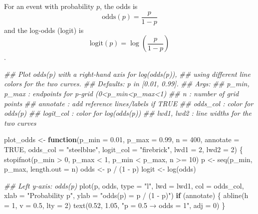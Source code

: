 \documentclass[
  letterpaper,
]{scrbook}
\newenvironment{Shaded}{\begin{snugshade}}{\end{snugshade}}
\newcommand{\AttributeTok}[1]{\textcolor[rgb]{0.40,0.45,0.13}{#1}}
\newcommand{\ConstantTok}[1]{\textcolor[rgb]{0.56,0.35,0.01}{#1}}
\newcommand{\ControlFlowTok}[1]{\textcolor[rgb]{0.00,0.23,0.31}{\textbf{#1}}}
\newcommand{\DecValTok}[1]{\textcolor[rgb]{0.68,0.00,0.00}{#1}}
\newcommand{\DocumentationTok}[1]{\textcolor[rgb]{0.37,0.37,0.37}{\textit{#1}}}
\newcommand{\FloatTok}[1]{\textcolor[rgb]{0.68,0.00,0.00}{#1}}
\newcommand{\FunctionTok}[1]{\textcolor[rgb]{0.28,0.35,0.67}{#1}}
\newcommand{\NormalTok}[1]{\textcolor[rgb]{0.00,0.23,0.31}{#1}}
\newcommand{\OtherTok}[1]{\textcolor[rgb]{0.00,0.23,0.31}{#1}}
\newcommand{\SpecialCharTok}[1]{\textcolor[rgb]{0.37,0.37,0.37}{#1}}
\newcommand{\StringTok}[1]{\textcolor[rgb]{0.13,0.47,0.30}{#1}}
\begin{document}
For an event with probability \(p\), the odds is
\[\mathrm{odds}(p)=\frac{p}{1-p}\] and the log-odds (logit) is
\[\mathrm{logit}(p)=\log\left(\frac{p}{1-p}\right)\].

\begin{Shaded}
\begin{Highlighting}[]
\DocumentationTok{\#\# Plot odds(p) with a right{-}hand axis for log(odds(p)),}
\DocumentationTok{\#\# using different line colors for the two curves.}
\DocumentationTok{\#\# Defaults: p in [0.01, 0.99].}
\DocumentationTok{\#\# Args:}
\DocumentationTok{\#\#   p\_min, p\_max : endpoints for p{-}grid (0\textless{}p\_min\textless{}p\_max\textless{}1)}
\DocumentationTok{\#\#   n            : number of grid points}
\DocumentationTok{\#\#   annotate     : add reference lines/labels if TRUE}
\DocumentationTok{\#\#   odds\_col     : color for odds(p)}
\DocumentationTok{\#\#   logit\_col    : color for log(odds(p))}
\DocumentationTok{\#\#   lwd1, lwd2   : line widths for the two curves}


\NormalTok{plot\_odds }\OtherTok{\textless{}{-}} \ControlFlowTok{function}\NormalTok{(}\AttributeTok{p\_min =} \FloatTok{0.01}\NormalTok{, }\AttributeTok{p\_max =} \FloatTok{0.99}\NormalTok{, }\AttributeTok{n =} \DecValTok{400}\NormalTok{,}
                      \AttributeTok{annotate =} \ConstantTok{TRUE}\NormalTok{,}
                      \AttributeTok{odds\_col =} \StringTok{"steelblue"}\NormalTok{,}
                      \AttributeTok{logit\_col =} \StringTok{"firebrick"}\NormalTok{,}
                      \AttributeTok{lwd1 =} \DecValTok{2}\NormalTok{, }\AttributeTok{lwd2 =} \DecValTok{2}\NormalTok{) \{}
  \FunctionTok{stopifnot}\NormalTok{(p\_min }\SpecialCharTok{\textgreater{}} \DecValTok{0}\NormalTok{, p\_max }\SpecialCharTok{\textless{}} \DecValTok{1}\NormalTok{, p\_min }\SpecialCharTok{\textless{}}\NormalTok{ p\_max, n }\SpecialCharTok{\textgreater{}=} \DecValTok{10}\NormalTok{)}
\NormalTok{  p }\OtherTok{\textless{}{-}} \FunctionTok{seq}\NormalTok{(p\_min, p\_max, }\AttributeTok{length.out =}\NormalTok{ n)}
\NormalTok{  odds }\OtherTok{\textless{}{-}}\NormalTok{ p }\SpecialCharTok{/}\NormalTok{ (}\DecValTok{1} \SpecialCharTok{{-}}\NormalTok{ p)}
\NormalTok{  logit }\OtherTok{\textless{}{-}} \FunctionTok{log}\NormalTok{(odds)}

  \DocumentationTok{\#\# Left y{-}axis: odds(p)}
  \FunctionTok{plot}\NormalTok{(p, odds, }\AttributeTok{type =} \StringTok{"l"}\NormalTok{, }\AttributeTok{lwd =}\NormalTok{ lwd1, }\AttributeTok{col =}\NormalTok{ odds\_col,}
       \AttributeTok{xlab =} \StringTok{"Probability p"}\NormalTok{,}
       \AttributeTok{ylab =} \StringTok{"odds(p) = p / (1 {-} p)"}\NormalTok{)}
  \ControlFlowTok{if}\NormalTok{ (annotate) \{}
    \FunctionTok{abline}\NormalTok{(}\AttributeTok{h =} \DecValTok{1}\NormalTok{, }\AttributeTok{v =} \FloatTok{0.5}\NormalTok{, }\AttributeTok{lty =} \DecValTok{2}\NormalTok{)}
    \FunctionTok{text}\NormalTok{(}\FloatTok{0.52}\NormalTok{, }\FloatTok{1.05}\NormalTok{, }\StringTok{"p = 0.5 → odds = 1"}\NormalTok{, }\AttributeTok{adj =} \DecValTok{0}\NormalTok{)}
\NormalTok{  \}}


\end{Highlighting}
\end{Shaded}
\end{document}
